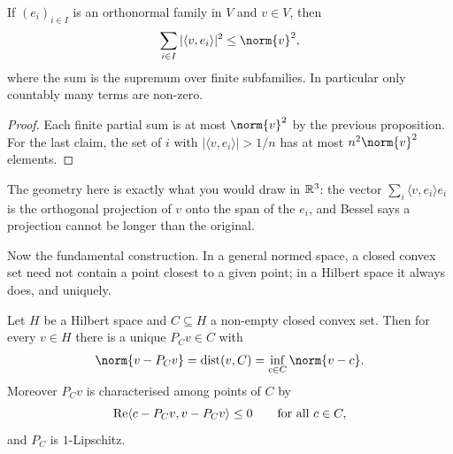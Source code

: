 \documentclass[a4paper]{scrartcl}
\newcommand{\ip}[2]{\langle #1, #2 \rangle}
\newcommand{\spn}{\operatorname{span}}
\DeclareMathOperator{\dist}{dist}
\begin{document}
\begin{corollary}
	If $(e_i)_{i \in I}$ is an orthonormal family in $V$ and $v \in V$, then
	$$\sum_{i \in I} |\ip{v}{e_i}|^2 \leq \norm{v}^2,$$
	where the sum is the supremum over finite subfamilies. In particular only countably many terms are non-zero.
\end{corollary}

\begin{proof}
	Each finite partial sum is at most $\norm{v}^2$ by the previous proposition. For the last claim, the set of $i$ with $|\ip{v}{e_i}| > 1/n$ has at most $n^2\norm{v}^2$ elements.
\end{proof}

The geometry here is exactly what you would draw in $\mathbb{R}^3$: the vector $\sum_i \ip{v}{e_i}e_i$ is the orthogonal projection of $v$ onto the span of the $e_i$, and Bessel says a projection cannot be longer than the original.

\begin{center}
\end{center}

Now the fundamental construction. In a general normed space, a closed convex set need not contain a point closest to a given point; in a Hilbert space it always does, and uniquely.

\begin{theorem}
	Let $H$ be a Hilbert space and $C \subseteq H$ a non-empty closed convex set. Then for every $v \in H$ there is a unique $P_Cv \in C$ with
	$$\norm{v - P_Cv} = \dist(v, C) = \inf_{c \in C}\norm{v - c}.$$
	Moreover $P_C v$ is characterised among points of $C$ by
	$$\re \ip{c - P_Cv}{v - P_Cv} \leq 0 \qquad \text{for all } c \in C,$$
	and $P_C$ is $1$-Lipschitz.
\end{theorem}
\end{document}
